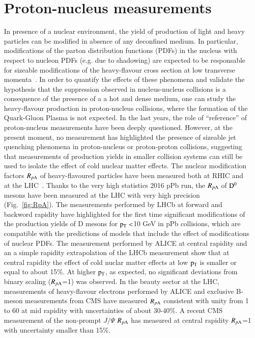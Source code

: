 \documentclass{webofc}
\begin{document}
\section{Proton-nucleus measurements}
\label{pAmeasurements}
In presence of a nuclear environment, the yield of production of light and heavy particles can be modified in absence of any deconfined medium. In particular, modifications of the 
parton distribution functions (PDFs) in the nucleus with respect to nucleon PDFs (e.g. due to shadowing) are expected to be responsable for sizeable modifications of the heavy-flavour cross section at 
low transverse momenta~\cite{saporegravis}. In order to quantify the effects of these phenomena and validate the hypothesis that the suppression observed in nucleus-nucleus collisions is a consequence of the presence of a a hot and dense medium, 
one can study the heavy-flavour production in proton-nucleus collisions, where the formation of the Quark-Gluon Plasma is not expected. In the last years, the role of ``reference'' of proton-nucleus measurements have been deeply questioned. 
However, at the present moment, no measurement has highlighted the presence of sizeable jet quenching phenomena in proton-nucleus or proton-proton collisions, suggesting that measurements of production yields in smaller 
collision systems can still be used to isolate the effect of cold nuclear matter effects.
The nuclear modification factors $R_{p \mathrm{A}}$ of heavy-flavoured particles have been measured both at RHIC and at the LHC~\cite{pPb1,pPb2,pPb3,pPb4,pPb5,pPb6,pPb7}. Thanks to the very high statistics 2016 pPb run, the $R_{p \mathrm{A}}$ of $\rm D^{0}$
mesons have been measured at the LHC with very high precision (Fig.~\ref{fig:RpA}). The measurements performed by LHCb at forward and backword rapidity have highlighted for the first time significant modifications of the production 
yields of D mesons for $\rm p_{\rm T} <$10 GeV in pPb collisions, which are compatible with the predictions of models that include the effect of modifications of nuclear PDFs. 
The measurement performed by ALICE at central rapidity and an a simple rapidity extrapolation of the LHCb measurement 
show that at central rapidity the effect of cold nuclar matter effects at low $\rm p_{\rm T} $ is smaller or equal to about 15$\%$. At higher $\rm p_{\rm T} $, as expected, no significant deviations
from binary scaling ($R_{p \mathrm{A}}$=1) was observed.  In the beauty sector at the LHC, measurements of heavy-flavour electrons performed by ALICE and exclusive B-meson measurements from CMS have measured $R_{p \mathrm{A}}$ consistent with 
unity from 1 to 60 \GeVc at mid rapidity with uncertainties of about 30-40$\%$. A recent CMS measurement of the non-prompt $J/\Psi$ $R_{p \mathrm{A}}$ has measured at central rapidity $R_{p \mathrm{A}}$=1 with uncertainty smaller than 15$\%$. 
\end{document}
